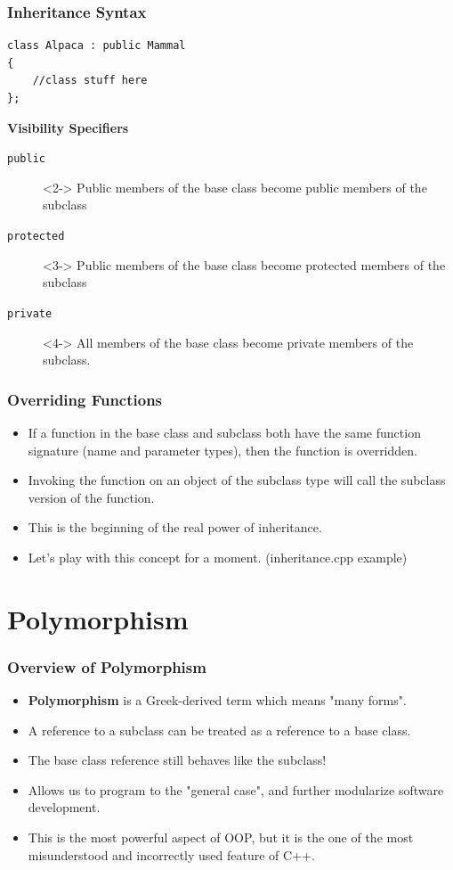 \documentclass{beamer}
\begin{document}
\begin{frame}[fragile]
    \frametitle{Inheritance Syntax}
    \begin{verbatim}
class Alpaca : public Mammal
{
    //class stuff here
};
    \end{verbatim}
    {\bf Visibility Specifiers}
    \begin{description}
        \item[{\tt public}]<2-> Public members of the base class become
            public members of the subclass
        \item[{\tt protected}]<3-> Public members of the base class become
            protected members of the subclass
        \item[{\tt private}]<4-> All members of the base class become private
            members of the subclass.
    \end{description}
\end{frame}

\begin{frame}
    \frametitle{Overriding Functions}
    \begin{itemize}
        \item<2-> If a function in the base class and subclass both have
            the same function signature (name and parameter types), 
            then the function is overridden.
        \item<3-> Invoking the function on an object of the subclass type
            will call the subclass version of the function.
        \item<4-> This is the beginning of the real power of inheritance.
        \item<5-> Let's play with this concept for a moment. 
            (inheritance.cpp example)
    \end{itemize}
\end{frame}

\section{Polymorphism}
\begin{frame}
    \frametitle{Overview of Polymorphism}
    \begin{itemize}
        \item<2-> {\bf Polymorphism} is a Greek-derived term which means "many forms".
        \item<3-> A reference to a subclass can be treated as a reference to
           a base class.
        \item<4-> The base class reference still behaves like the subclass!
        \item<5-> Allows us to program to the "general case", and further 
           modularize software development.
        \item<6-> This is the most powerful aspect of OOP, but it is the
           one of the most misunderstood and incorrectly used feature 
           of C++.
    \end{itemize}
\end{frame}
\end{document}
